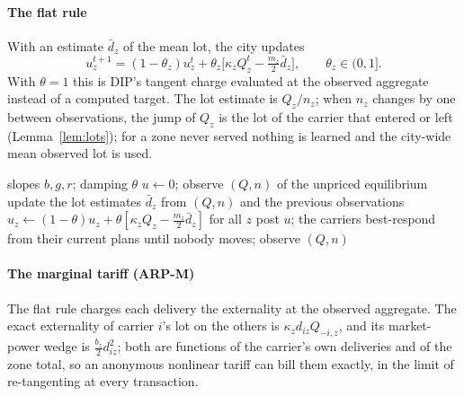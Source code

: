 \documentclass[preprint,11pt]{elsarticle}
\theoremstyle{definition}
\theoremstyle{remark}
\begin{document}
\paragraph{The flat rule} With an estimate $\bar d_z$ of the mean lot, the city updates
\begin{equation}\label{eq:rule}
u^{t+1}_z=(1-\theta_z)u^t_z+\theta_z\big[\kappa_zQ^t_z-\tfrac{m_z}{2}\bar d_z\big],\qquad\theta_z\in(0,1].
\end{equation}
With $\theta=1$ this is DIP's tangent charge evaluated at the observed aggregate instead of a computed target. The lot estimate is $Q_z/n_z$; when $n_z$ changes by one between observations, the jump of $Q_z$ is the lot of the carrier that entered or left (Lemma~\ref{lem:lots}); for a zone never served nothing is learned and the city-wide mean observed lot is used.

\begin{algorithm}[t]
\caption{ARP flat rule}\label{alg:arp}
\begin{algorithmic}[1]
\Require slopes $b,g,r$; damping $\theta$
\State $u\gets0$; observe $(Q,n)$ of the unpriced equilibrium
\Repeat
  \State update the lot estimates $\bar d_z$ from $(Q,n)$ and the previous observations
  \State $u_z\gets(1-\theta)u_z+\theta[\kappa_zQ_z-\tfrac{m_z}{2}\bar d_z]$ for all $z$
  \State post $u$; the carriers best-respond from their current plans until nobody moves; observe $(Q,n)$
\end{algorithmic}
\end{algorithm}

\paragraph{The marginal tariff (ARP-M)} The flat rule charges each delivery the externality at the observed aggregate. The exact externality of carrier $i$'s lot on the others is $\kappa_zd_{iz}Q_{-i,z}$, and its market-power wedge is $\tfrac{b_z}{2}d_{iz}^2$; both are functions of the carrier's own deliveries and of the zone total, so an anonymous nonlinear tariff can bill them exactly, in the limit of re-tangenting at every transaction.
\end{document}
